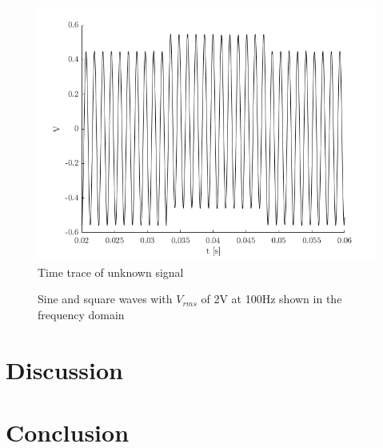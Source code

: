 \documentclass[letterpaper,12pt]{article}
\begin{document}
\begin{figure}[h!]
    \centering
    \includegraphics[scale=.7 ]{mysteryTime.png}
    \caption{Time trace of unknown signal}
    \label{UnknownTime}
\end{figure}

\begin{figure}[h!]
\centering
{}
\quad
{}
\caption{Sine and square waves with $V_{rms}$ of 2V at 100Hz shown in the frequency domain}
\end{figure}


\section{Discussion}

\section{Conclusion}
\end{document}
